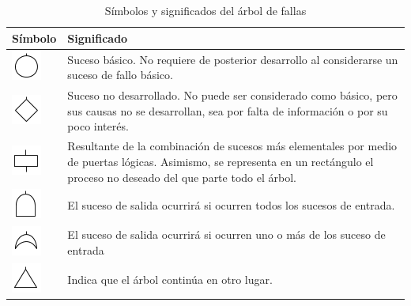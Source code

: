 \begin{table}[H]
\centering
\begin{tabular}{|l|p{7cm}|}
\hline
Símbolo & Significado \\
\hline
\includegraphics[scale=1]{images/arbol/basico.png} & Suceso básico. No requiere de posterior desarrollo al considerarse un suceso de fallo básico. \\ 
\hline
\includegraphics[scale=1]{images/arbol/nodesarrollado.png} & Suceso no desarrollado. No puede ser considerado como básico, pero sus causas no se desarrollan, sea por falta de información o por su poco interés.\\
\hline
\includegraphics[scale=1]{images/arbol/intermedio.png} & Resultante de la combinación de sucesos más elementales por medio de puertas lógicas. Asimismo, se representa en un rectángulo el proceso no deseado del que parte todo el árbol. \\
\hline
\includegraphics[scale=1]{images/arbol/puertay.png} & El suceso de salida ocurrirá si ocurren todos los sucesos de entrada.\\
\hline
\includegraphics[scale=1]{images/arbol/puertao.png} & El suceso de salida ocurrirá si ocurren uno o más de los suceso de entrada\\
\hline
\includegraphics[scale=1]{images/arbol/transferencia.png} & Indica que el árbol continúa en otro lugar. \\
\hline
\end{tabular}
\caption{Símbolos y significados del árbol de fallas \citep{pique1998}}
\end{table}

